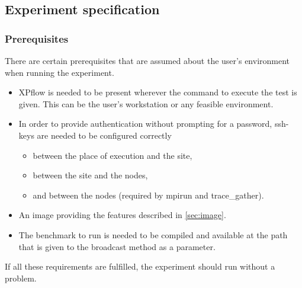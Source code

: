 \subsection{Experiment specification}
\subsubsection{Prerequisites}
There are certain prerequisites that are assumed about the user's
environment when running the experiment.
\begin{itemize}
\item XPflow is needed to be present wherever the command to execute
the test is given. This can be the user's workstation or any feasible
environment.
\item In order to provide authentication without prompting for a
password, ssh-keys are needed to be configured correctly
  \begin{itemize}
  \item between the place of execution and the site,
  \item between the site and the nodes,
  \item and between the nodes (required by mpirun and trace\_gather).
  \end{itemize}
\item An image providing the features described in \ref{sec:image}.
\item The benchmark to run is needed to be compiled and available at
  the path that is given to the broadcast method as a parameter.
\end{itemize}
If all these requirements are fulfilled, the experiment should run
without a problem.
